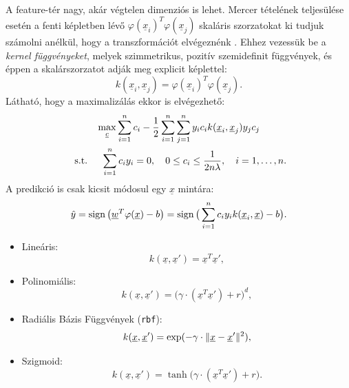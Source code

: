 

A feature-tér nagy, akár végtelen dimenziós is lehet. Mercer tételének teljesülése esetén a fenti képletben lévő
$ \varphi(\underline{x}_i)^T \varphi(\underline{x}_j) $ skaláris szorzatokat ki tudjuk számolni anélkül, hogy a transzformációt 
elvégeznénk \cite{hofmann2008kernel}.
Ehhez vezessük be a \textit{kernel függvényeket}, melyek szimmetrikus, pozitív szemidefinit függvények, és éppen a skalárszorzatot adják meg explicit képlettel:
\[
k(\underline{x}_i, \underline{x}_j) = \varphi(\underline{x}_i)^T \varphi(\underline{x}_j).
\]
Látható, hogy a maximalizálás ekkor is elvégezhető:
\begin{multline*}
\max\limits_{\underline{c}} \sum\limits_{i=1}^{n}c_i - 
\frac{1}{2}\sum\limits_{{i}=1}^{n}\sum\limits_{{j}=1}^{n} y_i c_i k(\underline{x}_i, \underline{x}_j) y_j c_j \\
\text{ s.t. } \quad 
\sum\limits_{{i}=1}^{n} c_i y_i = 0, \quad
0 \leq c_i \leq \frac{1}{2n\lambda}, \quad 
i=1,\dots,n.
\end{multline*}
A predikció is csak kicsit módosul egy $ \underline{x} $ mintára:
\[
\hat{y} = \operatorname{sign}\big(\underline{w}^T \varphi(\underline{x}) - b\big) = \operatorname{sign}\big(\sum\limits_{{i}=1}^{n} c_i y_i k(\underline{x}_i, \underline{x}) - b\big).
\]

\label{sec:kernelek}

\begin{itemize}

\item 
Lineáris:
\[  k(\underline{x}, \underline{x}') = \underline{x}^T  \underline{x}'  ,\]

\item 
Polinomiális:
\[  k(\underline{x}, \underline{x}') = \big(\gamma \cdot (\underline{x}^T  \underline{x}') + r\big)^d  ,\]

\item 
Radiális Bázis Függvények (\texttt{rbf}):
\[  k(\underline{x}, \underline{x}') = \exp( - \gamma \cdot \lVert\underline{x} - \underline{x}'\rVert^2)  ,\]

\item 
Szigmoid: 
\[  
k(\underline{x}, \underline{x}') = \tanh\big(\gamma \cdot (\underline{x}^T  \underline{x}') + r\big)  .
\]

\end{itemize}


